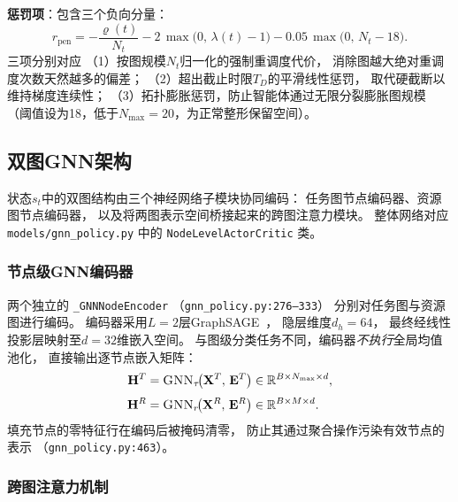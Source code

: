\noindent\textbf{惩罚项}：包含三个负向分量：
\begin{equation}
  r_{\text{pen}} =
    -\frac{\varrho(t)}{N_t}
    - 2\,\max\!\bigl(0,\, \lambda(t)-1\bigr)
    - 0.05\,\max\!\bigl(0,\, N_t - 18\bigr).
  \label{eq:reward_pen}
\end{equation}
三项分别对应
（1）按图规模$N_t$归一化的强制重调度代价，
消除图越大绝对重调度次数天然越多的偏差；
（2）超出截止时限$T_D$的平滑线性惩罚，
取代硬截断以维持梯度连续性；
（3）拓扑膨胀惩罚，防止智能体通过无限分裂膨胀图规模
（阈值设为18，低于$N_{\max}=20$，为正常整形保留空间）。

\subsection{双图GNN架构}
\label{subsec:gnn}

状态$s_t$中的双图结构由三个神经网络子模块协同编码：
任务图节点编码器、资源图节点编码器，
以及将两图表示空间桥接起来的跨图注意力模块。
整体网络对应 \texttt{models/gnn\_policy.py}
中的 \texttt{NodeLevelActorCritic} 类。

\subsubsection*{节点级GNN编码器}

两个独立的 \texttt{\_GNNNodeEncoder}
（\texttt{gnn\_policy.py:276--333}）
分别对任务图与资源图进行编码。
编码器采用$L=2$层GraphSAGE~\cite{hamilton2017inductive}，
隐层维度$d_h = 64$，
最终经线性投影层映射至$d = 32$维嵌入空间。
与图级分类任务不同，编码器\emph{不执行}全局均值池化，
直接输出逐节点嵌入矩阵：
\begin{align}
  \mathbf{H}^T &= \textsc{GNN}_\tau\!\bigl(\mathbf{X}^T,\,\mathbf{E}^T\bigr)
    \in \mathbb{R}^{B \times N_{\max} \times d},
  \label{eq:task_enc}\\[3pt]
  \mathbf{H}^R &= \textsc{GNN}_r\!\bigl(\mathbf{X}^R,\,\mathbf{E}^R\bigr)
    \in \mathbb{R}^{B \times M \times d}.
  \label{eq:res_enc}
\end{align}
填充节点的零特征行在编码后被掩码清零，
防止其通过聚合操作污染有效节点的表示
（\texttt{gnn\_policy.py:463}）。

\subsubsection*{跨图注意力机制}

